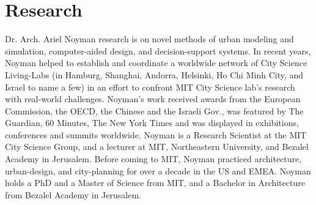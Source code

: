 \section*{Research}

 {
  Dr. Arch. Ariel Noyman research is on novel methods of urban modeling and simulation, computer-aided design, and decision-support systems. In recent years, Noyman helped to establish and coordinate a worldwide network of City Science Living-Labs (in Hamburg, Shanghai, Andorra, Helsinki, Ho Chi Minh City, and Israel to name a few) in an effort to confront MIT City Science lab's research with real-world challenges. Noyman's work received awards from the European Commission, the OECD, the Chinese and the Israeli Gov., was featured by The Guardian, 60 Minutes, The New York Times and was displayed in exhibitions, conferences and summits worldwide. Noyman is a Research Scientist at the MIT City Science Group, and a lecturer at MIT, Northeastern University, and Bezalel Academy in Jerusalem. Before coming to MIT, Noyman practiced architecture, urban-design, and city-planning for over a decade in the US and EMEA. Noyman holds a PhD and a Master of Science from MIT, and a Bachelor in Architecture from Bezalel Academy in Jerusalem.
 }

